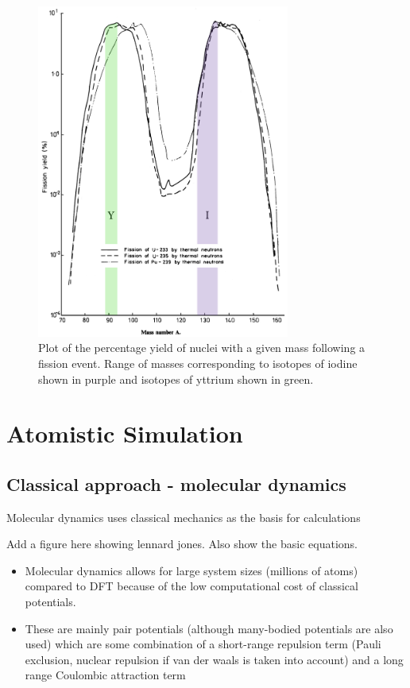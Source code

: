\begin{figure}[htp]
\centering
\includegraphics[height=11cm]{images/fissionyield.jpg}
\caption{Plot of the percentage yield of nuclei with a given mass following a fission event. Range of masses corresponding to isotopes of iodine shown in purple and isotopes of yttrium shown in green.}
\label{figure:fissionyield}
\end{figure}

\section{Atomistic Simulation}

\subsection{Classical approach - molecular dynamics}

Molecular dynamics uses classical mechanics as the basis for calculations 

Add a figure here showing lennard jones. Also show the basic equations.

\begin{itemize}
\item Molecular dynamics allows for large system sizes (millions of atoms) compared to DFT because of the low computational cost of classical potentials. 
\item These are mainly pair potentials (although many-bodied potentials are also used) which are some combination of a short-range repulsion term (Pauli exclusion, nuclear repulsion if van der waals is taken into account) and a long range Coulombic attraction term
\end{itemize}

